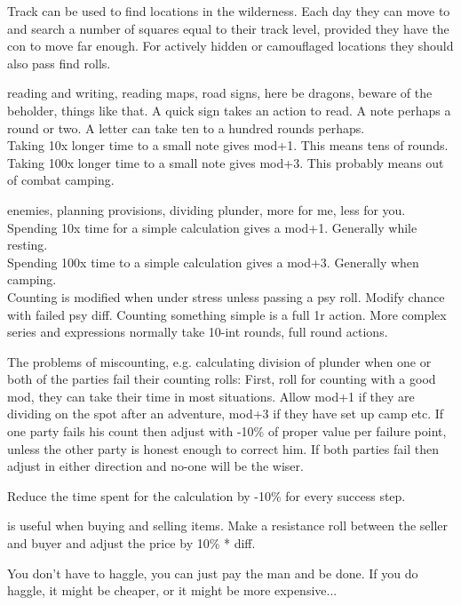 Track can be used to find locations in the wilderness. Each day they can move to and search a number of squares equal to their track level, provided they have the con to move far enough. For actively hidden or camouflaged locations they should also pass find rolls.


 reading and writing, reading maps, road signs, here be dragons, beware of the beholder, things like that. A quick sign takes an action to read. A note perhaps a round or two. A letter can take ten to a hundred rounds perhaps. \\
Taking 10x longer time to a small note gives mod+1. This means tens of rounds. \\
Taking 100x longer time to a small note gives mod+3. This probably means out of combat camping.


 enemies, planning provisions, dividing plunder, more for me, less for you. \\
Spending 10x time for a simple calculation gives a mod+1. Generally while resting.\\
Spending 100x time to a simple calculation gives a mod+3. Generally when camping.\\

Counting is modified when under stress unless passing a psy roll. Modify chance with failed psy diff. Counting something simple is a full 1r action. More complex series and expressions normally take 10-int rounds, full round actions.

The problems of miscounting, e.g. calculating division of plunder when one or both of the parties fail their counting rolls: First, roll for counting with a good mod, they can take their time in most situations. Allow mod+1 if they are dividing on the spot after an adventure, mod+3 if they have set up camp etc.
If one party fails his count then adjust with -10\% of proper value per failure point, unless the other party is honest enough to correct him. If both parties fail then adjust in either direction and no-one will be the wiser.

Reduce the time spent for the calculation by -10\% for every success step.


 is useful when buying and selling items. Make a resistance roll between the seller and buyer and adjust the price by 10\% * diff.

You don't have to haggle, you can just pay the man and be done. If you do haggle, it might be cheaper, or it might be more expensive...

